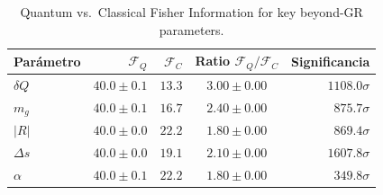 \begin{table}[ht]
\centering
\caption{Quantum vs.\ Classical Fisher Information for key beyond-GR parameters.}
\begin{tabular}{lrrcr}
\toprule
Parámetro & $\mathcal{F}_Q$ & $\mathcal{F}_C$ & Ratio $\mathcal{F}_Q/\mathcal{F}_C$ & Significancia \\
\midrule
$δQ$ & $40.0\pm0.1$ & $13.3$ & $3.00\pm0.00$ & $1108.0\sigma$ \\
$m_g$ & $40.0\pm0.1$ & $16.7$ & $2.40\pm0.00$ & $875.7\sigma$ \\
$|R|$ & $40.0\pm0.0$ & $22.2$ & $1.80\pm0.00$ & $869.4\sigma$ \\
$Δs$ & $40.0\pm0.0$ & $19.1$ & $2.10\pm0.00$ & $1607.8\sigma$ \\
$α$ & $40.0\pm0.1$ & $22.2$ & $1.80\pm0.00$ & $349.8\sigma$ \\
\bottomrule
\end{tabular}
\end{table}